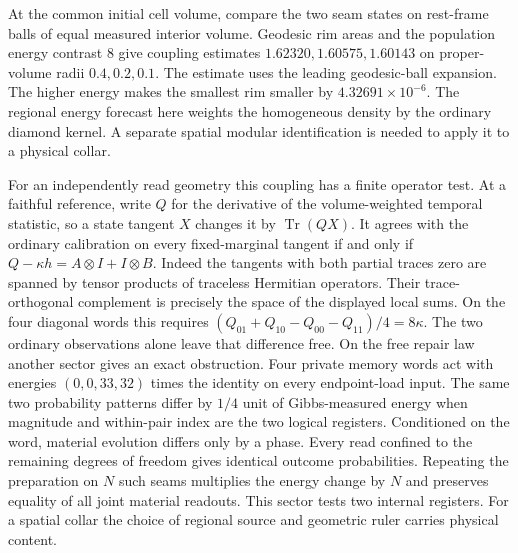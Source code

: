 \documentclass[11pt]{article}
\begin{document}
At the common initial cell volume, compare the two seam states on
rest-frame balls of equal measured interior volume. Geodesic rim
areas and the population energy contrast 8 give coupling estimates
$1.62320,1.60575,1.60143$ on proper-volume radii $0.4,0.2,0.1$.
The estimate uses the leading geodesic-ball expansion. The higher
energy makes the smallest rim smaller by $4.32691\times10^{-6}$.
The regional energy forecast here weights the homogeneous density by
the ordinary diamond kernel. A separate spatial modular identification
is needed to apply it to a physical collar.

For an independently read geometry this coupling has a finite operator
test. At a faithful reference, write $Q$ for the derivative of the
volume-weighted temporal statistic, so a state tangent $X$ changes it
by $\operatorname{Tr}(QX)$. It agrees with the ordinary calibration on
every fixed-marginal tangent if and only if
$Q-\kappa h=A\otimes I+I\otimes B$. Indeed the tangents with both
partial traces zero are spanned by tensor products of traceless
Hermitian operators. Their trace-orthogonal complement is precisely
the space of the displayed local sums. On the four diagonal words
this requires $(Q_{01}+Q_{10}-Q_{00}-Q_{11})/4=8\kappa$.
The two ordinary observations alone leave that difference free.
On the free repair law another sector gives an exact obstruction.
Four private memory words act with energies $(0,0,33,32)$ times the
identity on every endpoint-load input. The same two probability
patterns differ by $1/4$ unit of Gibbs-measured energy when magnitude
and within-pair index are the two logical registers. Conditioned on
the word, material evolution differs only by a phase. Every read
confined to the remaining degrees of freedom gives identical outcome
probabilities. Repeating the preparation on $N$ such seams multiplies
the energy change by $N$ and preserves equality of all joint material
readouts. This sector tests two internal registers. For a spatial
collar the choice of regional source and geometric ruler carries
physical content.
\end{document}
